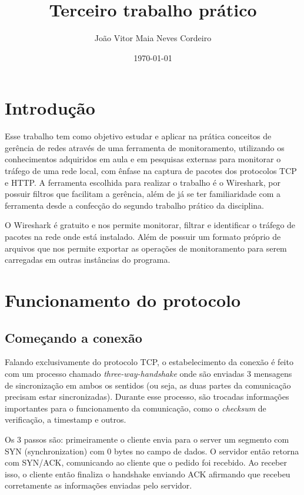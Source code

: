 \documentclass[12pt]{article}
\author{João Vitor Maia Neves Cordeiro}
\title{Terceiro trabalho prático}
\date{\today}
\begin{document}
\maketitle

\clearpage

{\setlength\parskip{\fill}
    \tableofcontents
}


\section{Introdução}

Esse trabalho tem como objetivo estudar e aplicar na prática conceitos de gerência de redes através de uma ferramenta de monitoramento, utilizando os conhecimentos adquiridos em aula e em pesquisas externas para monitorar o tráfego de uma rede local, com ênfase na captura de pacotes dos protocolos TCP e HTTP. A ferramenta escolhida para realizar o trabalho é o Wireshark, por possuir filtros que facilitam a gerência, além de já se ter familiaridade com a ferramenta desde a confecção do segundo trabalho prático da disciplina.

O Wireshark é gratuito e nos permite monitorar, filtrar e identificar o tráfego de pacotes na rede onde está instalado. Além de possuir um formato próprio de arquivos que nos permite exportar as operações de monitoramento para serem carregadas em outras instâncias do programa.

\section{Funcionamento do protocolo}

\subsection{Começando a conexão}

Falando exclusivamente do protocolo TCP, o estabelecimento da conexão é feito com um processo chamado \emph{three-way-handshake} onde são enviadas 3 mensagens de sincronização em ambos os sentidos (ou seja, as duas partes da comunicação precisam estar sincronizadas). Durante esse processo, são trocadas informações importantes para o funcionamento da comunicação, como o \emph{checksum} de verificação, a timestamp e outros.

Os 3 passos são: primeiramente o cliente envia para o server um segmento com SYN (synchronization) com 0 bytes no campo de dados. O servidor então retorna com SYN/ACK, comunicando ao cliente que o pedido foi recebido. Ao receber isso, o cliente então finaliza o handshake enviando ACK afirmando que recebeu corretamente as informações enviadas pelo servidor.
\end{document}
